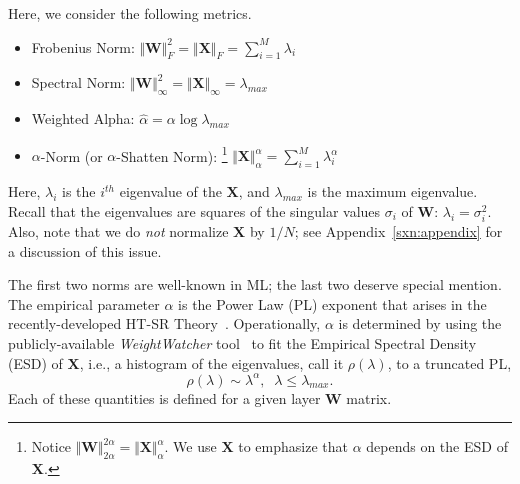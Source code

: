 Here, we consider the following metrics.

\begin{itemize}
\item 
Frobenius Norm: $\Vert\mathbf{W}\Vert^{2}_{F}=\Vert\mathbf{X}\Vert_{F}=\sum_{i=1}^{M} \lambda_{i}$
\item 
Spectral Norm: $\Vert\mathbf{W}\Vert_{\infty}^{2}=\Vert\mathbf{X}\Vert_{\infty}=\lambda_{max}$
\item 
Weighted Alpha: $\hat{\alpha}=\alpha\log\lambda_{max}$
\item 
$\alpha$-Norm (or $\alpha$-Shatten Norm):%
\footnote{Notice $\Vert\mathbf{W}\Vert^{2\alpha}_{2\alpha}=\Vert\mathbf{X}\Vert^{\alpha}_{\alpha}$. We use $\mathbf{X}$ to emphasize that $\alpha$ depends on the ESD of $\mathbf{X}$.}
 $\Vert\mathbf{X}\Vert^{\alpha}_{\alpha}=\sum_{i=1}^{M}\lambda_{i}^{\alpha}$
\end{itemize}
Here, $\lambda_{i}$ is the $i^{th}$ eigenvalue of the $\mathbf{X}$, and $\lambda_{max}$ is the maximum eigenvalue.
Recall that the eigenvalues are squares of the singular values $\sigma_{i}$ of $\mathbf{W}$: $\lambda_{i}=\sigma^{2}_{i}$.
Also, note that we do \emph{not} normalize $\mathbf{X}$ by $1/N$; see Appendix~\ref{sxn:appendix} for a discussion of this issue.

The first two norms are well-known in ML; the last two deserve special mention.
The empirical parameter $\alpha$ is the Power Law (PL) exponent that arises in the recently-developed HT-SR Theory~\cite{MM18_TR, MM19_HTSR_ICML, MM20_SDM}.
Operationally, $\alpha$ is determined by using the publicly-available \emph{WeightWatcher} tool~\cite{weightwatcher_package} to fit the Empirical Spectral Density (ESD) of $\mathbf{X}$, i.e., a histogram of the eigenvalues, call it $\rho(\lambda)$, to a truncated PL, 
\begin{equation}
\rho(\lambda)\sim\lambda^{\alpha},\;\;\lambda\le\lambda_{max}.
\end{equation}
Each of these quantities is defined for a given layer $\mathbf{W}$ matrix.

